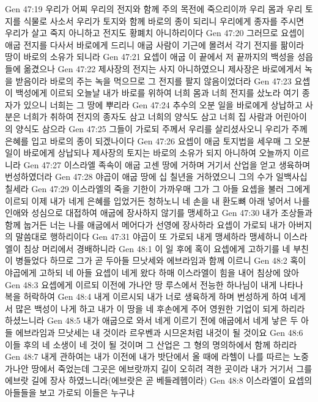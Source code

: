 Gen 47:19  우리가 어찌 우리의 전지와 함께 주의 목전에 죽으리이까 우리 몸과 우리 토지를 식물로 사소서 우리가 토지와 함께 바로의 종이 되리니 우리에게 종자를 주시면 우리가 살고 죽지 아니하고 전지도 황폐치 아니하리이다
Gen 47:20  그러므로 요셉이 애굽 전지를 다사서 바로에게 드리니 애굽 사람이 기근에 몰려서 각기 전지를 팖이라 땅이 바로의 소유가 되니라
Gen 47:21  요셉이 애굽 이 끝에서 저 끝까지의 백성을 성읍들에 옮겼으나
Gen 47:22  제사장의 전지는 사지 아니하였으니 제사장은 바로에게서 녹을 받음이라 바로의 주는 녹을 먹으므로 그 전지를 팔지 않음이었더라
Gen 47:23  요셉이 백성에게 이르되 오늘날 내가 바로를 위하여 너희 몸과 너희 전지를 샀노라 여기 종자가 있으니 너희는 그 땅에 뿌리라
Gen 47:24  추수의 오분 일을 바로에게 상납하고 사분은 너희가 취하여 전지의 종자도 삼고 너희의 양식도 삼고 너희 집 사람과 어린아이의 양식도 삼으라
Gen 47:25  그들이 가로되 주께서 우리를 살리셨사오니 우리가 주께 은혜를 입고 바로의 종이 되겠나이다
Gen 47:26  요셉이 애굽 토지법을 세우매 그 오분 일이 바로에게 상납되나 제사장의 토지는 바로의 소유가 되지 아니하여 오늘까지 이르니라
Gen 47:27  이스라엘 족속이 애굽 고센 땅에 거하며 거기서 산업을 얻고 생육하며 번성하였더라
Gen 47:28  야곱이 애굽 땅에 십 칠년을 거하였으니 그의 수가 일백사십 칠세라
Gen 47:29  이스라엘의 죽을 기한이 가까우매 그가 그 아들 요셉을 불러 그에게 이르되 이제 내가 네게 은혜를 입었거든 청하노니 네 손을 내 환도뼈 아래 넣어서 나를 인애와 성심으로 대접하여 애굽에 장사하지 않기를 맹세하고
Gen 47:30  내가 조상들과 함께 눕거든 너는 나를 애굽에서 메어다가 선영에 장사하라 요셉이 가로되 내가 아버지의 말씀대로 행하리이다
Gen 47:31  야곱이 또 가로되 내게 맹세하라 맹세하니 이스라엘이 침상 머리에서 경배하니라
Gen 48:1  이 일 후에 혹이 요셉에게 고하기를 네 부친이 병들었다 하므로 그가 곧 두아들 므낫세와 에브라임과 함께 이르니
Gen 48:2  혹이 야곱에게 고하되 네 아들 요셉이 네게 왔다 하매 이스라엘이 힘을 내어 침상에 앉아
Gen 48:3  요셉에게 이르되 이전에 가나안 땅 루스에서 전능한 하나님이 내게 나타나 복을 허락하여
Gen 48:4  내게 이르시되 내가 너로 생육하게 하며 번성하게 하여 네게서 많은 백성이 나게 하고 내가 이 땅을 네 후손에게 주어 영원한 기업이 되게 하리라 하셨느니라
Gen 48:5  내가 애굽으로 와서 네게 이르기 전에 애굽에서 네게 낳은 두 아들 에브라임과 므낫세는 내 것이라 르우벤과 시므온처럼 내것이 될 것이요
Gen 48:6  이들 후의 네 소생이 네 것이 될 것이며 그 산업은 그 형의 명의하에서 함께 하리라
Gen 48:7  내게 관하여는 내가 이전에 내가 밧단에서 올 때에 라헬이 나를 따르는 노중 가나안 땅에서 죽었는데 그곳은 에브랏까지 길이 오히려 격한 곳이라 내가 거기서 그를 에브랏 길에 장사 하였느니라(에브랏은 곧 베들레헴이라)
Gen 48:8  이스라엘이 요셉의 아들들을 보고 가로되 이들은 누구냐
